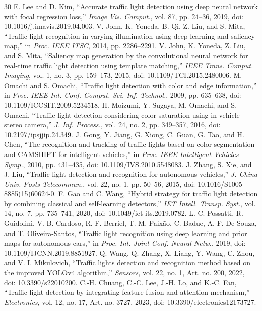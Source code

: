 \documentclass[conference]{IEEEtran}
\begin{document}
\begin{thebibliography}{30}
 E. Lee and D. Kim, ``Accurate traffic light detection using deep neural network with focal regression loss,'' \emph{Image Vis. Comput.}, vol. 87, pp. 24--36, 2019, doi: 10.1016/j.imavis.2019.04.003.
 V. John, K. Yoneda, B. Qi, Z. Liu, and S. Mita, ``Traffic light recognition in varying illumination using deep learning and saliency map,'' in \emph{Proc. IEEE ITSC}, 2014, pp. 2286--2291.
 V. John, K. Yoneda, Z. Liu, and S. Mita, ``Saliency map generation by the convolutional neural network for real-time traffic light detection using template matching,'' \emph{IEEE Trans. Comput. Imaging}, vol. 1, no. 3, pp. 159--173, 2015, doi: 10.1109/TCI.2015.2480006.
 M. Omachi and S. Omachi, ``Traffic light detection with color and edge information,'' in \emph{Proc. IEEE Int. Conf. Comput. Sci. Inf. Technol.}, 2009, pp. 635--638, doi: 10.1109/ICCSIT.2009.5234518.
 H. Moizumi, Y. Sugaya, M. Omachi, and S. Omachi, ``Traffic light detection considering color saturation using in-vehicle stereo camera,'' \emph{J. Inf. Process.}, vol. 24, no. 2, pp. 349--357, 2016, doi: 10.2197/ipsjjip.24.349.
 J. Gong, Y. Jiang, G. Xiong, C. Guan, G. Tao, and H. Chen, ``The recognition and tracking of traffic lights based on color segmentation and CAMSHIFT for intelligent vehicles,'' in \emph{Proc. IEEE Intelligent Vehicles Symp.}, 2010, pp. 431--435, doi: 10.1109/IVS.2010.5548083.
 J. Zhang, S. Xie, and J. Liu, ``Traffic light detection and recognition for autonomous vehicles,'' \emph{J. China Univ. Posts Telecommun.}, vol. 22, no. 1, pp. 50--56, 2015, doi: 10.1016/S1005-8885(15)60624-0.
 F. Gao and C. Wang, ``Hybrid strategy for traffic light detection by combining classical and self-learning detectors,'' \emph{IET Intell. Transp. Syst.}, vol. 14, no. 7, pp. 735--741, 2020, doi: 10.1049/iet-its.2019.0782.
 L. C. Possatti, R. Guidolini, V. B. Cardoso, R. F. Berriel, T. M. Paix\~ao, C. Badue, A. F. De Souza, and T. Oliveira-Santos, ``Traffic light recognition using deep learning and prior maps for autonomous cars,'' in \emph{Proc. Int. Joint Conf. Neural Netw.}, 2019, doi: 10.1109/IJCNN.2019.8851927.
 Q. Wang, Q. Zhang, X. Liang, Y. Wang, C. Zhou, and V. I. Mikulovich, ``Traffic lights detection and recognition method based on the improved YOLOv4 algorithm,'' \emph{Sensors}, vol. 22, no. 1, Art. no. 200, 2022, doi: 10.3390/s22010200.
 C.-H. Chuang, C.-C. Lee, J.-H. Lo, and K.-C. Fan, ``Traffic light detection by integrating feature fusion and attention mechanism,'' \emph{Electronics}, vol. 12, no. 17, Art. no. 3727, 2023, doi: 10.3390/electronics12173727.

\end{thebibliography}
\end{document}
